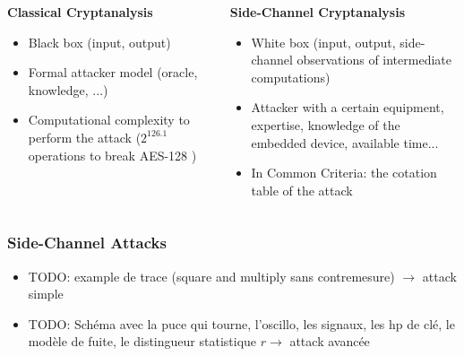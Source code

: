 \begin{frame}
\begin{columns}
\begin{column}{.5\textwidth}
\textbf{Classical Cryptanalysis}
\begin{itemize}
\item Black box (input, output)
\item Formal attacker model (oracle, knowledge, ...)
\item Computational complexity to perform the attack (\eg $2^{126.1}$ operations to break AES-128 \cite{bogdanov})
\end{itemize}
\end{column}
\begin{column}{.5\textwidth}
\textbf{Side-Channel Cryptanalysis}
\begin{itemize}
\item White box (input, output, side-channel observations of intermediate computations)
\item Attacker with a certain equipment, expertise, knowledge of the embedded device, available time...
\item In Common Criteria: the cotation table of the attack
\end{itemize}
\end{column}
\end{columns}

\end{frame}

\begin{frame}
\frametitle{Side-Channel Attacks}
\begin{itemize}
\item TODO: example de trace (square and multiply sans contremesure) $\rightarrow$ attack simple
\item TODO: Schéma avec la puce qui tourne, l'oscillo, les signaux, les hp de clé, le modèle de fuite, le distingueur statistique $r\rightarrow$ attack avancée

\end{itemize}
\end{frame}

